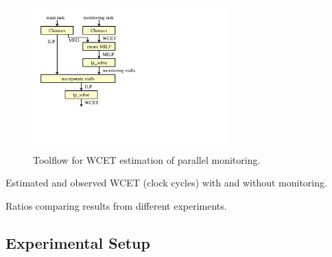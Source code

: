 \begin{figure}%
  \begin{center}
    \vspace{-0.1in}
    \includegraphics[height=2.2in]{figs/monitoring_wcet/toolflow.pdf}
    \vspace{-0.1in}
    \caption{Toolflow for WCET estimation of parallel monitoring.}
    \label{fig:evaluation.toolflow}
    \vspace{-0.3in}
  \end{center}
\end{figure}

\begin{table}[htb]
  \begin{center}
    \begin{scriptsize}
    
    \end{scriptsize}
    \vspace{-0.1in}
    \caption{Estimated and observed WCET (clock cycles) with and without monitoring.}
    \label{tab:evaluation.wcet}
    \vspace{-0.2in}
  \end{center}
\end{table}

\begin{table}[htb]
  \begin{center}
    \begin{tiny}
    
    \end{tiny}
    \vspace{-0.1in}
    \caption{Ratios comparing results from different experiments.} \label{tab:evaluation.ratios}
    \vspace{-0.3in}
  \end{center}
\end{table}

\vspace{-0.0in}
\subsection{Experimental Setup}

